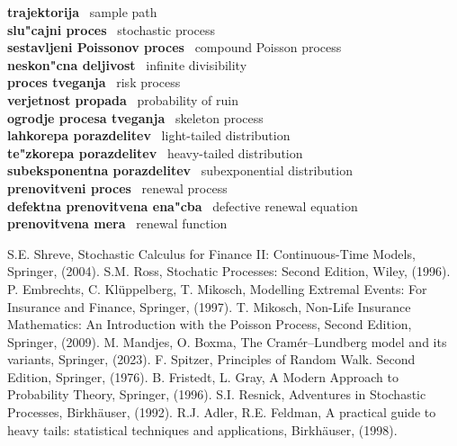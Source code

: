 \documentclass[12pt, a4paper, reqno]{amsart}
\theoremstyle{definition}
\theoremstyle{plain}
\newcommand{\1}{\mathds{1}}
\begin{document}
\noindent
\textbf{trajektorija} \ sample path \\
\textbf{slu"cajni proces} \ stochastic process \\
\textbf{sestavljeni Poissonov proces} \ compound Poisson process \\
\textbf{neskon"cna deljivost} \ infinite divisibility \\
\textbf{proces tveganja} \ risk process \\
\textbf{verjetnost propada} \ probability of ruin \\
\textbf{ogrodje procesa tveganja} \ skeleton process \\
\textbf{lahkorepa porazdelitev} \ light-tailed distribution \\
\textbf{te"zkorepa porazdelitev} \ heavy-tailed distribution \\
\textbf{subeksponentna porazdelitev} \ subexponential distribution \\
\textbf{prenovitveni proces} \ renewal process \\
\textbf{defektna prenovitvena ena"cba} \ defective renewal equation \\
\textbf{prenovitvena mera} \ renewal function \\

\begin{thebibliography}{99}
S.E. Shreve, Stochastic Calculus for Finance II: Continuous-Time Models, Springer, (2004).
S.M. Ross, Stochatic Processes: Second Edition, Wiley, (1996).
P. Embrechts, C. Klüppelberg, T. Mikosch, Modelling Extremal Events: For Insurance and Finance, Springer, (1997).
T. Mikosch, Non-Life Insurance Mathematics: An Introduction with the Poisson Process, Second Edition, Springer, (2009).
M. Mandjes, O. Boxma, The Cramér--Lundberg model and its variants, Springer, (2023).
F. Spitzer, Principles of Random Walk. Second Edition, Springer, (1976).
B. Fristedt, L. Gray, A Modern Approach to Probability Theory, Springer, (1996).
S.I. Resnick, Adventures in Stochastic Processes, Birkhäuser, (1992).
R.J. Adler, R.E. Feldman, A practical guide to heavy tails: statistical techniques and applications, Birkhäuser, (1998).
\end{thebibliography}
\end{document}
